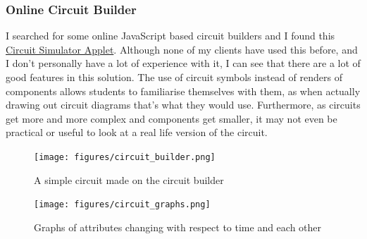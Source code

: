 \documentclass[11pt]{article}
\begin{document}
            \subsubsection{Online Circuit Builder}
                I searched for some online JavaScript based circuit builders and I found this \href{https://www.falstad.com/circuit/}{Circuit Simulator Applet}. Although none of my clients have used this before, and I don't personally have a lot of experience with it, I can see that there are a lot of good features in this solution. The use of circuit symbols instead of renders of components allows students to familiarise themselves with them, as when actually drawing out circuit diagrams that's what they would use. Furthermore, as circuits get more and more complex and components get smaller, it may not even be practical or useful to look at a real life version of the circuit. 

                \begin{figure}[!ht]
                    \begin{center}
                        \texttt{[image: figures/circuit\_builder.png]}
                    \end{center}
                    \caption{A simple circuit made on the circuit builder}
                    \label{fig:builderss}
                \end{figure}

                \begin{figure}[!ht]
                    \begin{center}
                        \texttt{[image: figures/circuit\_graphs.png]}
                    \end{center}
                    \caption{Graphs of attributes changing with respect to time and each other}
                    \label{fig:circuit_builder_existing_sol}
                \end{figure}
\end{document}
